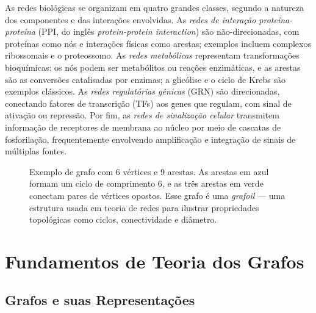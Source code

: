 As redes biológicas se organizam em quatro grandes classes, segundo a natureza dos
componentes e das interações envolvidas. As \emph{redes de interação proteína-proteína}
(PPI, do inglês \textit{protein-protein interaction}) são não-direcionadas, com proteínas
como nós e interações físicas como arestas; exemplos incluem complexos ribossomais e o
proteossomo. As \emph{redes metabólicas} representam transformações bioquímicas: os nós
podem ser metabólitos ou reações enzimáticas, e as arestas são as conversões catalisadas
por enzimas; a glicólise e o ciclo de Krebs são exemplos clássicos. As \emph{redes
regulatórias gênicas} (GRN) são direcionadas, conectando fatores de transcrição (TFs) aos
genes que regulam, com sinal de ativação ou repressão. Por fim, as \emph{redes de sinalização
celular} transmitem informação de receptores de membrana ao núcleo por meio de cascatas de
fosforilação, frequentemente envolvendo amplificação e integração de sinais de múltiplas
fontes.

\begin{figure}[htbp]
\centering
{}
\caption{Exemplo de grafo com 6 vértices e 9 arestas. As arestas em azul formam um ciclo de comprimento 6, e as três arestas em verde conectam pares de vértices opostos. Esse grafo é uma \emph{grafoil} --- uma estrutura usada em teoria de redes para ilustrar propriedades topológicas como ciclos, conectividade e diâmetro.}
\label{fig:03-grafo-exemplo}
\end{figure}


\section{Fundamentos de Teoria dos Grafos}

\subsection{Grafos e suas Representações}


